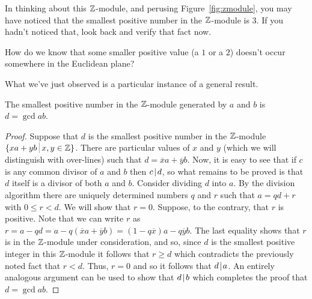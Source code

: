 In thinking about this ${\mathbb Z}$-module, and perusing 
Figure~\ref{fig:zmodule}, you may have noticed that the smallest 
positive number in the ${\mathbb Z}$-module is 3.  If you hadn't 
noticed that, look back and verify that fact now.  

\begin{exer}
How do we know that some smaller positive value (a $1$ or a $2$) doesn't
occur somewhere in the Euclidean plane?
\end{exer}

What we've just observed is a particular instance of a general result.

\begin{thm} \label{gcd!exists}
The smallest positive number in the ${\mathbb Z}$-module generated by
$a$ and $b$ is $d = \gcd{a}{b}$.
\end{thm}

\begin{proof}
Suppose that $d$ is the smallest positive number
in the ${\mathbb Z}$-module $\{ xa + yb \suchthat x,y \in \Integers \}$.  
There are particular values of $x$ and $y$ (which we will distinguish
with over-lines) such that $d = \overline{x}a + \overline{y}b$.  Now, it 
is easy to see that if $c$ is any common divisor of $a$ and $b$ then
$c \!\mid\! d$, so what remains to be proved is that $d$ itself is a divisor
of both $a$ and $b$.  Consider dividing $d$ into $a$.  By the 
division algorithm there are uniquely determined numbers $q$ and $r$
such that $a =qd + r$ with $0 \leq r < d$.  We will show that $r=0$.
Suppose, to the contrary, that $r$ is positive.  Note that we can
write $r$ as $r = a - qd = a - q(\overline{x}a + \overline{y}b) = (1-q\overline{x})a - q\overline{y}b$.  The last equality shows that $r$ is in the
${\mathbb Z}$-module under consideration, and so, since $d$ is the smallest
positive integer in this ${\mathbb Z}$-module it follows that $r \geq d$ which
contradicts the previously noted fact that $r < d$.  Thus, $r=0$ and so
it follows that $d \!\mid\! a$.  An entirely analogous argument can be used
to show that $d \!\mid\! b$ which completes the proof that $d = \gcd{a}{b}$. 
\end{proof} 
 

\clearpage







%
%

 
